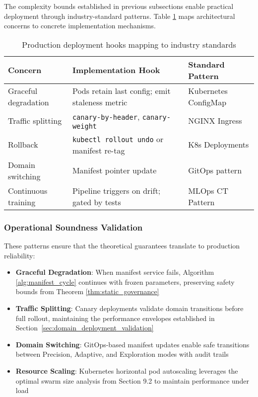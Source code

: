 \documentclass{article}
\begin{document}
The complexity bounds established in previous subsections enable practical deployment through industry-standard patterns. Table \ref{tab:production_hooks} maps architectural concerns to concrete implementation mechanisms.

\begin{table}[h]
\centering
\begin{tabular}{|l|l|l|}
\hline
\textbf{Concern} & \textbf{Implementation Hook} & \textbf{Standard Pattern} \\
\hline
Graceful degradation & Pods retain last config; emit staleness metric & Kubernetes ConfigMap \\
Traffic splitting & \texttt{canary-by-header}, \texttt{canary-weight} & NGINX Ingress \\
Rollback & \texttt{kubectl rollout undo} or manifest re-tag & K8s Deployments \\
Domain switching & Manifest pointer update & GitOps pattern \\
Continuous training & Pipeline triggers on drift; gated by tests & MLOps CT Pattern \\
\hline
\end{tabular}
\caption{Production deployment hooks mapping to industry standards}
\label{tab:production_hooks}
\end{table}

\subsubsection{Operational Soundness Validation}

These patterns ensure that the theoretical guarantees translate to production reliability:

\begin{itemize}
\item \textbf{Graceful Degradation}: When manifest service fails, Algorithm \ref{alg:manifest_cycle} continues with frozen parameters, preserving safety bounds from Theorem \ref{thm:static_governance}
\item \textbf{Traffic Splitting}: Canary deployments validate domain transitions before full rollout, maintaining the performance envelopes established in Section~\ref{sec:domain_deployment_validation}

\item \textbf{Domain Switching}: GitOps-based manifest updates enable safe transitions between Precision, Adaptive, and Exploration modes with audit trails
\item \textbf{Resource Scaling}: Kubernetes horizontal pod autoscaling leverages the optimal swarm size analysis from Section 9.2 to maintain performance under load
\end{itemize}
\end{document}
